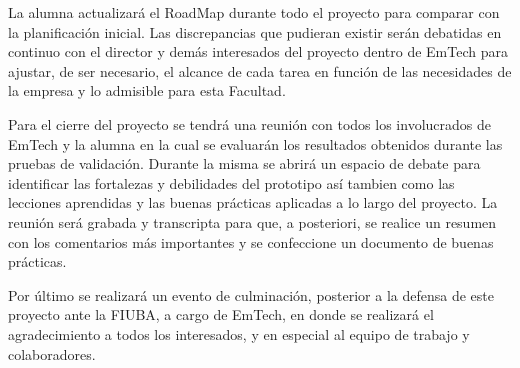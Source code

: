 \documentclass[
11pt, %
]{charter}
\begin{document}
La alumna actualizará el RoadMap durante todo el proyecto para comparar con la planificación inicial. Las discrepancias que pudieran existir serán debatidas en continuo con el director y demás interesados del proyecto dentro de EmTech para ajustar, de ser necesario, el alcance de cada tarea en función de las necesidades de la empresa y lo admisible para esta Facultad. 

Para el cierre del proyecto se tendrá una reunión con todos los involucrados de EmTech y la alumna en la cual se evaluarán los resultados obtenidos durante las pruebas de validación. Durante la misma se abrirá un espacio de debate para identificar las fortalezas y debilidades del prototipo así tambien como las lecciones aprendidas y las buenas prácticas aplicadas a lo largo del proyecto. La reunión será grabada y transcripta para que, a posteriori, se realice un resumen con los comentarios más importantes y se confeccione un documento de buenas prácticas. 

Por último se realizará un evento de culminación, posterior a la defensa de este proyecto ante la FIUBA, a cargo de EmTech, en donde se realizará el agradecimiento a todos los interesados, y en especial al equipo de trabajo y colaboradores. 


 
\end{document}
